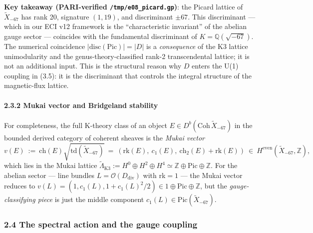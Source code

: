 \documentclass[
  11pt,
  a4paper,
]{article}
\begin{document}
\textbf{Key takeaway (PARI-verified \texttt{/tmp/e08\_picard.gp})}: the Picard lattice of \(\tilde X_{-67}\) has rank 20, signature \((1, 19)\), and discriminant \(\pm 67\). This discriminant --- which in our ECI v12 framework is the ``characteristic invariant'' of the abelian gauge sector --- coincides with the fundamental discriminant of \(K = \mathbb Q(\sqrt{-67})\). The numerical coincidence \(|\mathrm{disc}(\mathrm{Pic})| = |D|\) is a \emph{consequence} of the K3 lattice unimodularity and the genus-theory-classified rank-2 transcendental lattice; it is not an additional input. This is the structural reason why \(D\) enters the U(1) coupling in (3.5): it is the discriminant that controls the integral structure of the magnetic-flux lattice.

\hypertarget{mukai-vector-and-bridgeland-stability}{%
\paragraph{2.3.2 Mukai vector and Bridgeland stability}\label{mukai-vector-and-bridgeland-stability}}

For completeness, the full K-theory class of an object \(E \in D^b(\mathrm{Coh}\,\tilde X_{-67})\) in the bounded derived category of coherent sheaves is the \emph{Mukai vector}
\[
v(E)\ :=\ \mathrm{ch}(E)\sqrt{\mathrm{td}(\tilde X_{-67})}\ =\ (\mathrm{rk}(E),\ c_1(E),\ \mathrm{ch}_2(E) + \mathrm{rk}(E))\ \in\ H^{\mathrm{even}}(\tilde X_{-67}, \mathbb Z),
\]
which lies in the Mukai lattice \(\widetilde\Lambda_{\mathrm{K3}} := H^0 \oplus H^2 \oplus H^4 \simeq \mathbb Z \oplus \mathrm{Pic} \oplus \mathbb Z\). For the abelian sector --- line bundles \(L = \mathcal O(D_{\mathrm{div}})\) with rk\(=1\) --- the Mukai vector reduces to \(v(L) = (1, c_1(L), 1 + c_1(L)^2/2) \in 1 \oplus \mathrm{Pic} \oplus \mathbb Z\), but the \emph{gauge-classifying piece} is just the middle component \(c_1(L) \in \mathrm{Pic}(\tilde X_{-67})\).

\hypertarget{the-spectral-action-and-the-gauge-coupling}{%
\subsubsection{2.4 The spectral action and the gauge coupling}\label{the-spectral-action-and-the-gauge-coupling}}
\end{document}

